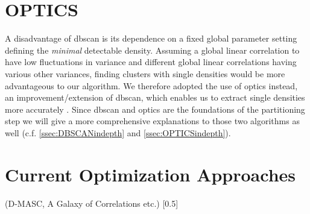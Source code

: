 \section{OPTICS}\label{sec:OPTICSintro}
A disadvantage of \gls{dbscan} is its dependence on a fixed global parameter setting defining the \textit{minimal} detectable density. Assuming a global linear correlation to have low fluctuations in variance and different global linear correlations having various other variances, finding clusters with single densities would be more advantageous to our algorithm. We therefore adopted the use of \gls{optics} instead, an improvement/extension of \gls{dbscan}, which enables us to extract single densities more accurately \cite{opticsankerst1999optics}. Since \gls{dbscan} and \gls{optics} are the foundations of the partitioning step we will give a more comprehensive explanations to those two algorithms as well (c.f. \autoref{ssec:DBSCANindepth} and \autoref{ssec:OPTICSindepth}).

\section{Current Optimization Approaches}
(D-MASC\cite{kazempour2018d, kazempour2019galaxy}, A Galaxy of Correlations etc.) [0.5] 
    
